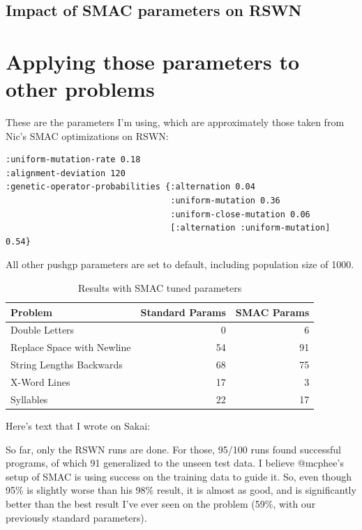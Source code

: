 \subsection{Impact of SMAC parameters on RSWN}
\label{sec:SMACimpactRSWN}


\section{Applying those parameters to other problems}
\label{sec:applyingToOtherProblems}

These are the parameters I'm using, which are approximately those taken from Nic's SMAC optimizations on RSWN:

\begin{verbatim}
:uniform-mutation-rate 0.18
:alignment-deviation 120
:genetic-operator-probabilities {:alternation 0.04
                                 :uniform-mutation 0.36
                                 :uniform-close-mutation 0.06
                                 [:alternation :uniform-mutation] 0.54}
\end{verbatim}

All other pushgp parameters are set to default, including population size of 1000.

\begin{table}[t]
\centering
\caption{Results with SMAC tuned parameters}
\label{table:results}
\begin{tabular}{l r r}
\toprule
\textbf{Problem} & \textbf{Standard Params} & \textbf{SMAC Params} \tabularnewline
\midrule
Double Letters	& 0 & 6 \tabularnewline
Replace Space with Newline & 54 & 91 \tabularnewline
String Lengths Backwards & 68 & 75 \tabularnewline
X-Word Lines & 17 & 3 \tabularnewline
Syllables & 22 & 17 \tabularnewline
\bottomrule
\end{tabular}
\end{table}

Here's text that I wrote on Sakai:

So far, only the RSWN runs are done. For those, 95/100 runs found successful programs, of which 91 generalized to the unseen test data. I believe @mcphee's setup of SMAC is using success on the training data to guide it. So, even though 95\% is slightly worse than his 98\% result, it is almost as good, and is significantly better than the best result I've ever seen on the problem (59\%, with our previously standard parameters).

